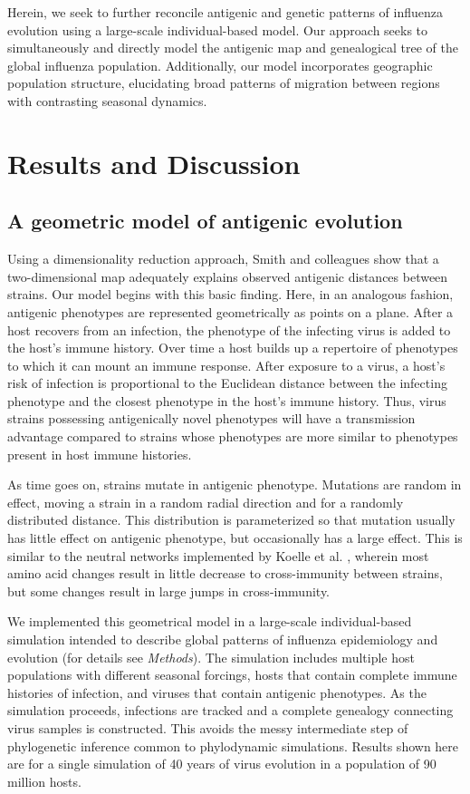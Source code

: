 \documentclass[11pt,oneside,letterpaper]{article}
\begin{document}
Herein, we seek to further reconcile antigenic and genetic patterns of influenza evolution using a large-scale individual-based model.  Our approach seeks to simultaneously and directly model the antigenic map and genealogical tree of the global influenza population.  Additionally, our model incorporates geographic population structure, elucidating broad patterns of migration between regions with contrasting seasonal dynamics.

\section*{Results and Discussion}

\subsection*{A geometric model of antigenic evolution}

Using a dimensionality reduction approach, Smith and colleagues \cite{Smith04} show that a two-dimensional map adequately explains observed antigenic distances between strains.  Our model begins with this basic finding.  Here, in an analogous fashion, antigenic phenotypes are represented geometrically as points on a plane.  After a host recovers from an infection, the phenotype of the infecting virus is added to the host's immune history.  Over time a host builds up a repertoire of phenotypes to which it can mount an immune response.  After exposure to a virus, a host's risk of infection is proportional to the Euclidean distance between the infecting phenotype and the closest phenotype in the host's immune history.  Thus, virus strains possessing antigenically novel phenotypes will have a transmission advantage compared to strains whose phenotypes are more similar to phenotypes present in host immune histories.

As time goes on, strains mutate in antigenic phenotype.  Mutations are random in effect, moving a strain in a random radial direction and for a randomly distributed distance.  This distribution is parameterized so that mutation usually has little effect on antigenic phenotype, but occasionally has a large effect.  This is similar to the neutral networks implemented by Koelle et al. \cite{Koelle06}, wherein most amino acid changes result in little decrease to cross-immunity between strains, but some changes result in large jumps in cross-immunity.

We implemented this geometrical model in a large-scale individual-based simulation intended to describe global patterns of influenza epidemiology and evolution (for details see \textsl{Methods}).  The simulation includes multiple host populations with different seasonal forcings, hosts that contain complete immune histories of infection, and viruses that contain antigenic phenotypes.  As the simulation proceeds, infections are tracked and a complete genealogy connecting virus samples is constructed.  This avoids the messy intermediate step of phylogenetic inference common to phylodynamic simulations.  Results shown here are for a single simulation of 40 years of virus evolution in a population of 90 million hosts.  
\end{document}
